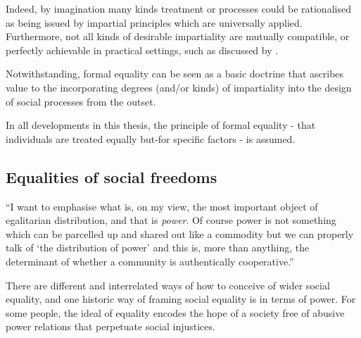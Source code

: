 Indeed, by imagination many kinds treatment or processes could be rationalised as being issued by impartial principles which are universally applied. Furthermore, not all kinds of desirable impartiality are mutually compatible, or perfectly achievable in practical settings, such as discussed by \cite{Hutchinson_2019}.

Notwithstanding, formal equality can be seen as a basic doctrine that ascribes value to the incorporating degrees (and/or kinds) of impartiality into the design of social processes from the outset.%

In all developments in this thesis, the principle of formal equality - that individuals are treated equally but-for specific factors - is assumed.

\subsection{Equalities of social freedoms}\label{sec:philosophy_social_freedoms}

\begin{displayquote}
``I want to emphasise what is, on my view, the most important object of egalitarian distribution, and that is \textit{power}. Of course power is not something which can be parcelled up and shared out like a commodity but we can properly talk of `the distribution of power' and this is, more than anything, the determinant of whether a community is authentically cooperative.'' \citep{TheSocialBasisofEquality:1998}
\end{displayquote}

There are different and interrelated ways of how to conceive of wider social equality, and one historic way of framing social equality is in terms of power.
For some people, the ideal of equality encodes the hope of a society free of abusive power relations that perpetuate social injustices.

